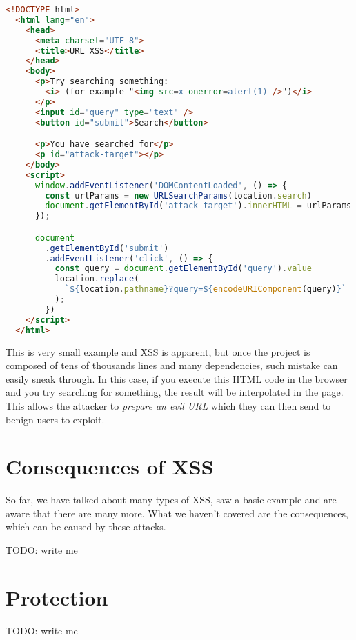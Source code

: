 \begin{lstlisting}[language=HTML]
  <!DOCTYPE html>
  <html lang="en">
    <head>
      <meta charset="UTF-8">
      <title>URL XSS</title>
    </head>
    <body>
      <p>Try searching something:
        <i> (for example "<img src=x onerror=alert(1) />")</i>
      </p>
      <input id="query" type="text" />
      <button id="submit">Search</button>

      <p>You have searched for</p>
      <p id="attack-target"></p>
    </body>
    <script>
      window.addEventListener('DOMContentLoaded', () => {
        const urlParams = new URLSearchParams(location.search)
        document.getElementById('attack-target').innerHTML = urlParams.get('query')
      });

      document
        .getElementById('submit')
        .addEventListener('click', () => {
          const query = document.getElementById('query').value
          location.replace(
            `${location.pathname}?query=${encodeURIComponent(query)}`
          );
        })
    </script>
  </html>
\end{lstlisting}

This is very small example and XSS is apparent, but once the project is composed of tens of
thousands lines and many dependencies, such mistake can easily sneak through. In this case, if you
execute this HTML code in the browser and you try searching for something, the result will be
interpolated in the page. This allows the attacker to \emph{prepare an evil URL} which they can then
send to benign users to exploit.

\section{Consequences of XSS}

So far, we have talked about many types of XSS, saw a basic example and are aware that there are
many more. What we haven't covered are the consequences, which can be caused by these attacks.

TODO: write me

\section{Protection}

TODO: write me

